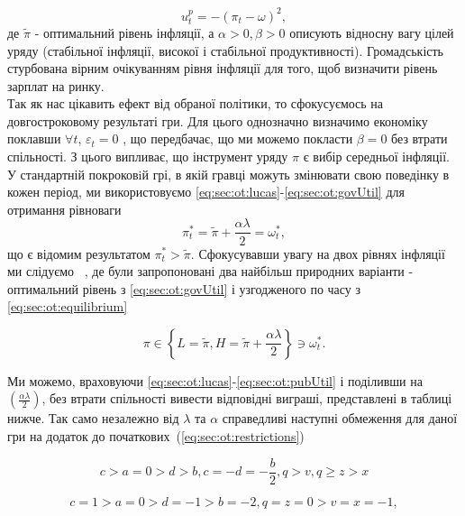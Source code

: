 \begin{equation}
\label{eq:sec:ot:pubUtil}
u^p_t=-(\pi_t - \omega)^2,
\end{equation}
де $\tilde{\pi}$ - оптимальний рівень інфляції, а $\alpha > 0, \beta > 0$ описують відносну вагу цілей уряду (стабільної інфляції, високої і стабільної продуктивності). Громадськість стурбована вірним очікуванням рівня інфляції для того, щоб визначити рівень зарплат на ринку.
\\

Так як нас цікавить ефект від обраної політики, то сфокусуємось на довгостроковому результаті гри. Для цього однозначно визначимо економіку поклавши $\forall t$,      $\varepsilon_t=0$ , що передбачає, що ми можемо покласти $\beta=0$ без втрати спільності. З цього випливає, що інструмент уряду $\pi$  є вибір середньої інфляції.
\\

У стандартній покроковiй грі, в якій гравці можуть змінювати свою поведінку в кожен період, ми використовуємо \eqref{eq:sec:ot:lucas}-\eqref{eq:sec:ot:govUtil} для отримання рівноваги
\begin{equation}
\label{eq:sec:ot:equilibrium}
\pi^*_t= \tilde{\pi} + \frac{\alpha\lambda}{2}= \omega^*_t,
\end{equation}
що є відомим результатом  $\pi^*_t > \tilde{\pi}$. Сфокусувавши увагу на двох рівнях інфляції ми слідуємо ~\cite{ChoiAndMacui96InflationFinancialMarkets}, де були запропоновані два найбільш природних варіанти - оптимальний рівень з \eqref{eq:sec:ot:govUtil} і узгодженого по часу з \eqref{eq:sec:ot:equilibrium}

\begin{equation}
\label{eq:sec:ot:optimal}
\pi \in \left\{L=\tilde{\pi}, H=\tilde{\pi}+\frac{\alpha\lambda}{2} \right\} \ni \omega^*_t.
\end{equation}

Ми можемо, враховуючи \eqref{eq:sec:ot:lucas}-\eqref{eq:sec:ot:pubUtil} і поділивши на $\left(\frac{\alpha\lambda}{2}\right)$,  без втрати спільності вивести відповідні виграші, представлені в таблиці нижче. Так само незалежно від $\lambda$ та  $\alpha$ справедливі наступні обмеження для даної гри на додаток до початкових~(\ref{eq:sec:ot:restrictions})

\begin{equation}
	\label{eq:sec:ot:constraint}
	c>a=0 > d > b,c=-d=-\frac{b}{2}, q>v,q\geqslant z>x
\end{equation}

\begin{equation}
\label{eq:sec:ot:exampleConstraint}
c=1 > a=0 > d=-1 > b=-2, q=z=0 > v=x=-1,
\end{equation}

